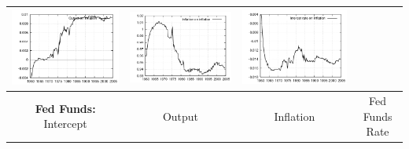 \documentclass{beamer}
\begin{document}
{\begin{tabular}{|cccc|}
  \includegraphics[scale=0.17]{plots2/initre_Output_on_inflation.png} &
  \includegraphics[scale=0.17]{plots2/initre_Inflation_on_inflation.png} & 
  \includegraphics[scale=0.17]{plots2/initre_Interest_rate_on_inflation.png} \\ \hline
  \small{\textbf{Fed Funds:} Intercept} & \small{Output} & \small{Inflation} & \small{Fed Funds Rate} \\ \hline

\end{tabular}}
\end{document}
